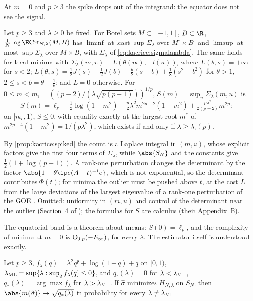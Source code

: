 \begin{refsection}
At $m=0$ and $p\ge3$ the spike drops out of the integrand: the equator does not see the signal.

\begin{theorem}\label{thm:kacrice:bammn}
Let $p\ge3$ and $\lambda\ge0$ be fixed. For Borel sets $M\subset[-1,1]$, $B\subset\R$, $\frac1N\log\E\kacriceCrt_{N,\lambda}(M,B)$ has $\liminf$ at least $\sup\Sigma_\lambda$ over $M^\circ\times B^\circ$ and $\limsup$ at most $\sup\Sigma_\lambda$ over $\bar M\times\bar B$, with $\Sigma_\lambda$ of \eqref{eq:kacrice:sigmalambda}. The same holds for local minima with $\Sigma_\lambda(m,u)-L(\theta(m),-t(u))$, where $L(\theta,s)=+\infty$ for $s<2$; $L(\theta,s)=\frac12J(s)-\frac12J(b)-\frac\theta2(s-b)+\frac18(s^2-b^2)$ for $\theta>1$, $2\le s<b=\theta+\frac1\theta$; and $L=0$ otherwise. For $0\le m<m_c=((p-2)/(\lambda\sqrt{p(p-1)}))^{1/p}$, $S(m)=\sup_u\Sigma_\lambda(m,u)$ is
\[
S(m)=\ell_p+\tfrac12\log(1-m^2)-\tfrac p2\lambda^2m^{2p-2}(1-m^2)+\tfrac{p\lambda^2}{2(p-2)}m^{2p};
\]
on $[m_c,1)$, $S\le0$, with equality exactly at the largest root $m^*$ of $m^{2p-4}(1-m^2)=1/(p\lambda^2)$, which exists if and only if $\lambda\ge\lambda_c(p)$.
\end{theorem}

\begin{proofsketch}
By \cref{prop:kacrice:spiked} the count is a Laplace integral in $(m,u)$, whose explicit factors give the first four terms of $\Sigma_\lambda$, while $\abs{S_N}$ and the constants give $\frac12(1+\log(p-1))$. A rank-one perturbation changes the determinant by the factor $\abs{1-\theta\ip e{(A-t)^{-1}e}}$, which is not exponential, so the determinant contributes $\Phi(t)$; for minima the outlier must be pushed above $t$, at the cost $L$ from the large deviations of the largest eigenvalue of a rank-one perturbation of the GOE \parencite{Maida2007}. Omitted: uniformity in $(m,u)$ and control of the determinant near the outlier (Section~4 of \textcite{BenArousMeiMontanariNica2019}); the formulas for $S$ are calculus (their Appendix~B).
\end{proofsketch}

The equatorial band is a theorem about means: $S(0)=\ell_p$, and the complexity of minima at $m=0$ is $\Theta_{0,p}(-E_\infty)$, for every $\lambda$. The estimator itself is understood exactly.

\begin{theorem}\label{thm:kacrice:jlm}
Let $p\ge3$, $f_\lambda(q)=\lambda^2q^p+\log(1-q)+q$ on $[0,1)$, $\lambda_{\mathrm{ML}}=\sup\{\lambda:\sup_qf_\lambda(q)\le0\}$, and $q_*(\lambda)=0$ for $\lambda<\lambda_{\mathrm{ML}}$, $q_*(\lambda)=\arg\max f_\lambda$ for $\lambda>\lambda_{\mathrm{ML}}$. If $\hat\sigma$ minimizes $H_{N,\lambda}$ on $S_N$, then $\abs{m(\hat\sigma)}\to\sqrt{q_*(\lambda)}$ in probability for every $\lambda\ne\lambda_{\mathrm{ML}}$.
\end{theorem}


\end{refsection}
